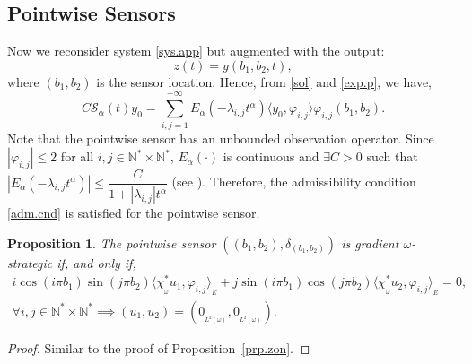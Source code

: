 \documentclass{article}
\newtheorem{proposition}[theorem]{Proposition}
\begin{document}

\subsection{Pointwise Sensors}

Now we reconsider system \eqref{sys.app} but
augmented with the output: 
\begin{equation}
\label{exp.p}
z(t) = y(b_1,b_2,t),
\end{equation}
where $(b_1,b_2)$ is the sensor location. 
Hence, from \eqref{sol} and \eqref{exp.p}, we have,
$$
C\mathcal{S}_\alpha(t)y_0 
= \displaystyle\sum_{i,j=1}^{+\infty}
E_{\alpha}(-\lambda_{i,j}t^{\alpha})\langle y_0,
\varphi_{i,j}\rangle\varphi_{i,j}(b_1,b_2).
$$
Note that the pointwise sensor has an unbounded observation operator. 
Since $|\varphi_{i,j}|\leq 2$ for all $i,j\in\mathbb{N}^*\times\mathbb{N}^*$, 
$E_\alpha(\cdot)$ is continuous and $\exists C>0$ such that 
$|E_\alpha(-\lambda_{i,j}t^\alpha)|\leq \dfrac{C}{1 + |\lambda_{i,j}|t^\alpha}$ 
(see \cite{regional.analysis}). Therefore, the admissibility 
condition \eqref{adm.cnd} is satisfied for the pointwise sensor. 

\begin{proposition}
The pointwise sensor $\left((b_1,b_2),\delta_{(b_1,b_2)}\right)$ 
is gradient $\omega$-strategic if, and only if, 
\begin{multline*}
i\cos(i\pi b_1)\sin(j\pi b_2) \langle \chi_{_\omega}^*u_1,
\varphi_{i,j}\rangle_{_{E}} + j\sin(i\pi b_1)
\cos(j\pi b_2) \langle \chi_{_\omega}^*u_2,\varphi_{i,j}\rangle_{_{E}} = 0,\\
\forall i,j\in \mathbb{N}^*\times\mathbb{N}^*
\implies (u_1,u_2) = (0_{_{L^2(\omega)}},0_{_{L^2(\omega)}}).
\end{multline*}
\end{proposition}

\begin{proof}
Similar to the proof of Proposition~\ref{prp.zon}.
\end{proof}
\end{document}
